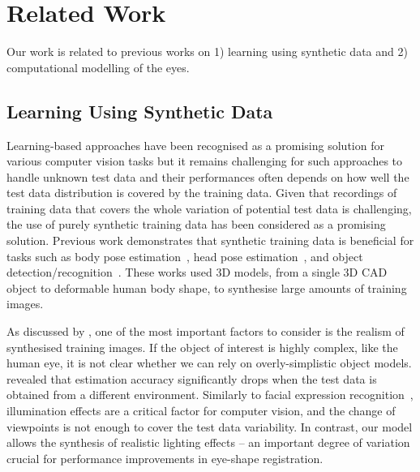 
\section{Related Work}

Our work is related to previous works on 1) learning using synthetic data and 2) computational modelling of the eyes.

\subsection{Learning Using Synthetic Data}

Learning-based approaches have been recognised as a promising solution for various computer vision tasks
but it remains challenging for such approaches to handle unknown test data and their performances often depends on how well the test data distribution is covered by the training data.
Given that recordings of training data that covers the whole variation of potential test data is challenging,
the use of purely synthetic training data has been considered as a promising solution.
Previous work demonstrates that synthetic training data is beneficial for tasks such as body pose estimation~\cite{shakhnarovich2003fast,okada2008relevant,shotton2013real}, head pose estimation~\cite{fanelli2011real}, and object detection/recognition~\cite{yu2010improving,liebelt2010multiview,jaderberg2014synthetic}.
These works used 3D models, from a single 3D CAD object to deformable human body shape, to synthesise large amounts of training images.

As discussed by \citet{kaneva2011evaluation}, one of the most important factors to consider is the realism of synthesised training images.
If the object of interest is highly complex, like the human eye, it is not clear whether we can rely on overly-simplistic object models.
\citet{zhang15_cvpr} revealed that estimation accuracy significantly drops when the test data is obtained from a different environment.
Similarly to facial expression recognition~\cite{stratou2011effect}, illumination effects are a critical factor for computer vision, and the change of viewpoints is not enough to cover the test data variability.
In contrast, our model allows the synthesis of realistic lighting effects -- an important degree of variation crucial for performance improvements in eye-shape registration.

